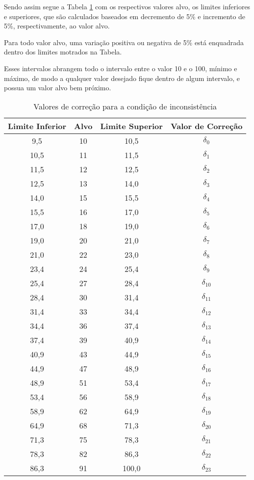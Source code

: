 Sendo assim segue a 
Tabela \ref{tab:correcaoDelta} 
com os respectivos valores alvo, 
os limites inferiores e superiores, 
que são calculados baseados em decremento de 5\% e
incremento de 5\%, respectivamente, ao valor alvo.

Para todo valor alvo, uma variação positiva ou negativa
de 5\% está enquadrada dentro dos limites motrados na Tabela.

Esses intervalos abrangem todo o intervalo entre 
o valor 10 e o 100, mínimo e máximo, 
de modo a qualquer valor desejado fique 
dentro de algum intervalo, 
e possua um valor alvo bem próximo.


\begin{table}[h]
\centering
\caption{Valores de correção para a condição de inconsistência}
\label{tab:correcaoDelta}

\begin{tabular}{c|c|c||c}
\hline
Limite Inferior & Alvo & Limite Superior & Valor de Correção\\ \hline
\hline
 9,5 & 10 & 10,5 & $\delta_0$ \\ \hline
10,5 & 11 & 11,5 & $\delta_1$ \\ \hline
11,5 & 12 & 12,5 & $\delta_2$ \\ \hline
12,5 & 13 & 14,0 & $\delta_3$ \\ \hline
14,0 & 15 & 15,5 & $\delta_4$ \\ \hline
15,5 & 16 & 17,0 & $\delta_5$ \\ \hline
17,0 & 18 & 19,0 & $\delta_6$ \\ \hline
19,0 & 20 & 21,0 & $\delta_7$ \\ \hline
21,0 & 22 & 23,0 & $\delta_8$ \\ \hline
23,4 & 24 & 25,4 & $\delta_9$ \\ \hline
25,4 & 27 & 28,4 & $\delta_{10}$ \\ \hline
28,4 & 30 & 31,4 & $\delta_{11}$ \\ \hline
31,4 & 33 & 34,4 & $\delta_{12}$ \\ \hline
34,4 & 36 & 37,4 & $\delta_{13}$ \\ \hline
37,4 & 39 & 40,9 & $\delta_{14}$ \\ \hline
40,9 & 43 & 44,9 & $\delta_{15}$ \\ \hline
44,9 & 47 & 48,9 & $\delta_{16}$ \\ \hline
48,9 & 51 & 53,4 & $\delta_{17}$ \\ \hline
53,4 & 56 & 58,9 & $\delta_{18}$ \\ \hline
58,9 & 62 & 64,9 & $\delta_{19}$ \\ \hline
64,9 & 68 & 71,3 & $\delta_{20}$ \\ \hline
71,3 & 75 & 78,3 & $\delta_{21}$ \\ \hline
78,3 & 82 & 86,3 & $\delta_{22}$ \\ \hline
86,3 & 91 &100,0 & $\delta_{23}$ \\ \hline


\end{tabular}
\end{table}
